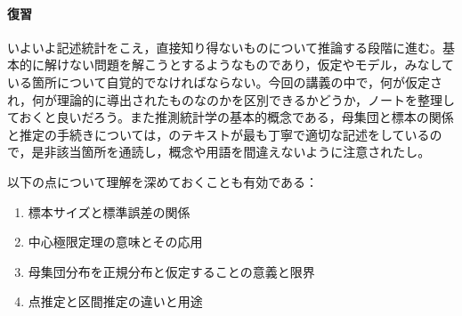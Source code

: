\paragraph{復習}
いよいよ記述統計をこえ，直接知り得ないものについて推論する段階に進む。基本的に解けない問題を解こうとするようなものであり，仮定やモデル，みなしている箇所について自覚的でなければならない。今回の講義の中で，何が仮定され，何が理論的に導出されたものなのかを区別できるかどうか，ノートを整理しておくと良いだろう。また推測統計学の基本的概念である，母集団と標本の関係と推定の手続きについては，\textcite{Yamada2004}のテキストが最も丁寧で適切な記述をしているので，是非該当箇所を通読し，概念や用語を間違えないように注意されたし。

以下の点について理解を深めておくことも有効である：
\begin{enumerate}
\item 標本サイズと標準誤差の関係
\item 中心極限定理の意味とその応用
\item 母集団分布を正規分布と仮定することの意義と限界
\item 点推定と区間推定の違いと用途
\end{enumerate}
